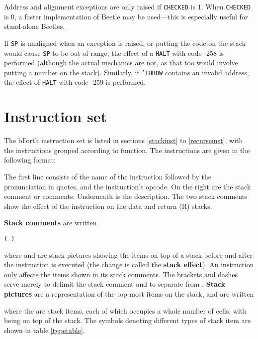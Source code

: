 Address and alignment exceptions are only raised if {\tt CHECKED} is 1. When
{\tt CHECKED} is 0, a faster implementation of Beetle may be used---this is
especially useful for stand-alone Beetles.

If {\tt SP} is unaligned when an exception is raised, or putting the code on the
stack would cause {\tt SP} to be out of range, the effect of a {\tt HALT} with
code -258 is performed (although the actual mechanics are not, as that too would
involve putting a number on the stack). Similarly, if {\tt 'THROW} contains an
invalid address, the effect of {\tt HALT} with code -259 is performed.


\section{Instruction set}
\label{instset}

The bForth instruction set is listed in sections \ref{stackinst} to
\ref{recurseinst}, with the instructions grouped according to function. The
instructions are given in the following format:

\begin{description}
\end{description}

The first line consists of the name of the instruction followed by the
pronunciation in quotes, and the instruction's opcode. On the right are the
stack comment or comments. Underneath is the description. The two stack comments
show the effect of the instruction on the data and return (R) stacks.

{\bf Stack comments} are written

\centerline{\tt (  )}

where  and  are stack pictures showing the items on top
of a stack before and after the instruction is executed (the change is called
the {\bf stack effect}). An instruction only affects the items shown in its
stack comments. The brackets and dashes serve merely to delimit the stack
comment and to separate  from . {\bf Stack pictures}
are a representation of the top-most items on the stack, and are written

\centerline{}

where the  are stack items, each of which occupies a whole number of
cells, with  being on top of the stack. The symbols denoting
different types of stack item are shown in table \ref{typetable}.

